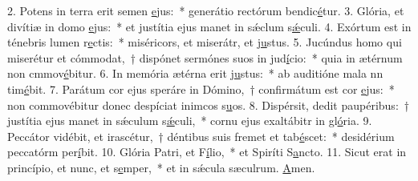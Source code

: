 2. Potens in terra erit semen \uline{e}jus:~* generátio rectórum bendic\uline{é}tur.
3. Glória, et divítiæ in domo \uline{e}jus:~* et justítia ejus manet in sǽclum s\uline{ǽ}culi.
4. Exórtum est in ténebris lumen r\uline{e}ctis:~* miséricors, et miserátr, et j\uline{u}stus.
5. Jucúndus homo qui miserétur et cómmodat,~† dispónet sermónes suos in jud\uline{í}cio:~* quia in ætérnum non cmmov\uline{é}bitur.
6. In memória ætérna erit j\uline{u}stus:~* ab auditióne mala nn tim\uline{é}bit.
7. Parátum cor ejus speráre in Dómino,~† confirmátum est cor \uline{e}jus:~* non commovébitur donec despíciat inimcos s\uline{u}os.
8. Dispérsit, dedit paupéribus:~† justítia ejus manet in sǽculum s\uline{ǽ}culi,~* cornu ejus exaltábitr in gl\uline{ó}ria.
9. Peccátor vidébit, et irascétur,~† déntibus suis fremet et tab\uline{é}scet:~* desidérium peccatórm per\uline{í}bit.
10. Glória Patri, et F\uline{í}lio,~* et Spiríti S\uline{a}ncto.
11. Sicut erat in princípio, et nunc, et s\uline{e}mper,~* et in sǽcula sæculrum. \uline{A}men.
